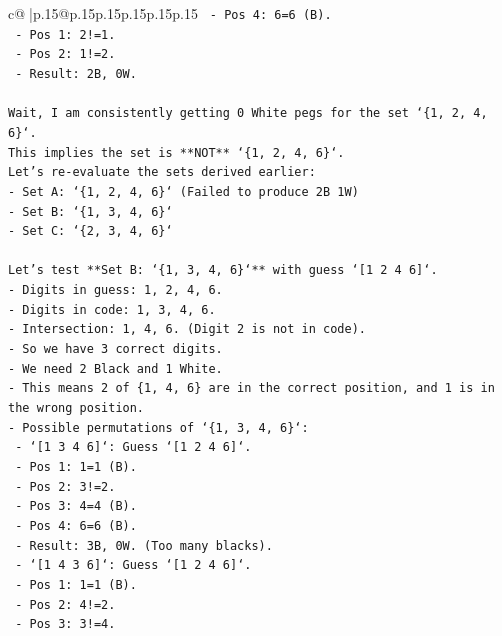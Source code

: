 \documentclass{article}
\begin{document}
{\begin{supertabular}{c@{$\;$}|p{.15\linewidth}@{}p{.15\linewidth}p{.15\linewidth}p{.15\linewidth}p{.15\linewidth}p{.15\linewidth}}
{{{\texttt{            {-}   Pos 4: 6=6 (B).} \\
\texttt{            {-}   Pos 1: 2!=1.} \\
\texttt{            {-}   Pos 2: 1!=2.} \\
\texttt{            {-}   Result: 2B, 0W.} \\
\\ 
\texttt{Wait, I am consistently getting 0 White pegs for the set `\{1, 2, 4, 6\}`.} \\
\texttt{This implies the set is **NOT** `\{1, 2, 4, 6\}`.} \\
\texttt{Let's re{-}evaluate the sets derived earlier:} \\
\texttt{{-} Set A: `\{1, 2, 4, 6\}` (Failed to produce 2B 1W)} \\
\texttt{{-} Set B: `\{1, 3, 4, 6\}`} \\
\texttt{{-} Set C: `\{2, 3, 4, 6\}`} \\
\\ 
\texttt{Let's test **Set B: `\{1, 3, 4, 6\}`** with guess `{[}1 2 4 6{]}`.} \\
\texttt{{-} Digits in guess: 1, 2, 4, 6.} \\
\texttt{{-} Digits in code: 1, 3, 4, 6.} \\
\texttt{{-} Intersection: 1, 4, 6. (Digit 2 is not in code).} \\
\texttt{{-} So we have 3 correct digits.} \\
\texttt{{-} We need 2 Black and 1 White.} \\
\texttt{{-} This means 2 of \{1, 4, 6\} are in the correct position, and 1 is in the wrong position.} \\
\texttt{{-} Possible permutations of `\{1, 3, 4, 6\}`:} \\
\texttt{    {-} `{[}1 3 4 6{]}`: Guess `{[}1 2 4 6{]}`.} \\
\texttt{        {-} Pos 1: 1=1 (B).} \\
\texttt{        {-} Pos 2: 3!=2.} \\
\texttt{        {-} Pos 3: 4=4 (B).} \\
\texttt{        {-} Pos 4: 6=6 (B).} \\
\texttt{        {-} Result: 3B, 0W. (Too many blacks).} \\
\texttt{    {-} `{[}1 4 3 6{]}`: Guess `{[}1 2 4 6{]}`.} \\
\texttt{        {-} Pos 1: 1=1 (B).} \\
\texttt{        {-} Pos 2: 4!=2.} \\
\texttt{        {-} Pos 3: 3!=4.} \\
}}}
\end{supertabular}}
\end{document}
